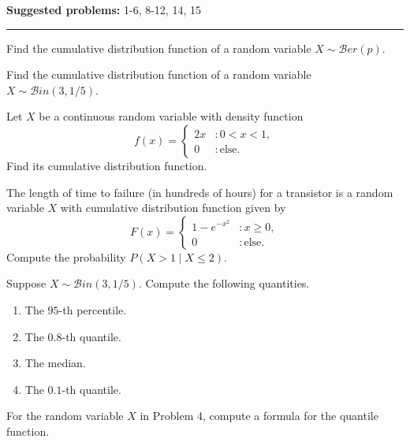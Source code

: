 \documentclass[12pt,reqno]{amsart}
\begin{document}
\textbf{Suggested problems:} 1-6, 8-12, 14, 15

\bigskip
\hrule

\bigskip
\prob Find the cumulative distribution function of a random variable $X\sim \mathcal{B}er(p)$.

\vfill
\prob Find the cumulative distribution function of a random variable $X \sim \mathcal{B}in(3, 1/5)$.

\vfill
\prob Let $X$ be a continuous random variable with density function
	\[
	f(x) = \begin{cases}
	2x & : 0 < x< 1, \\
	0 & : \text{else}.
	\end{cases}
	\]
Find its cumulative distribution function.

\vfill
\prob The length of time to failure (in hundreds of hours) for a transistor is a random variable $X$ with cumulative distribution function given by
	\[
	F(x) = \begin{cases}
	1-e^{-x^2} & : x\geq 0, \\
	0 & : \text{else}.
	\end{cases}
	\]
Compute the probability $P(X > 1 \mid X \leq 2)$.
	
\vfill
\newpage
\prob Suppose $X \sim \mathcal{B}in(3,1/5)$. Compute the following quantities.

\medskip
\begin{enumerate}
\item The $95$-th percentile.\vfill
\item The $0.8$-th quantile.\vfill
\item The median.\vfill
\item The $0.1$-th quantile.
\end{enumerate}
	
\vfill	
\prob For the random variable $X$ in Problem 4, compute a formula for the quantile function.

\vfill
\end{document}
